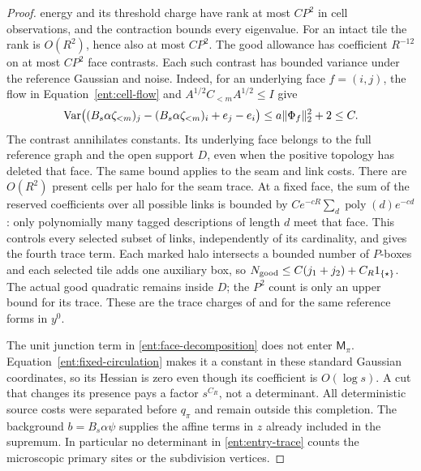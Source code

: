 \begin{proof}
energy and its threshold charge have rank at most \(CP^2\) in cell
observations, and the contraction bounds every eigenvalue.
For an intact tile the rank is \(O(R^2)\), hence also at most \(CP^2\).
The good allowance has coefficient \(R^{-12}\) on at most
\(CP^2\) face contrasts.  Each such contrast has bounded variance
under the reference Gaussian and noise.  Indeed, for an underlying
face \(f=(i,j)\), the flow in Equation~\eqref{ent:cell-flow} and
\(A^{1/2}C_{<m}A^{1/2}\le I\) give
\[
 \operatorname{Var}\bigl((B_s\alpha\zeta_{<m})_j-(B_s\alpha\zeta_{<m})_i
                              +e_j-e_i\bigr)
       \le a\|\Phi_f\|_2^2+2\le C.
\]
The contrast annihilates constants.  Its underlying face belongs to
the full reference graph and the open support \(D\), even when the
positive topology has deleted that face.  The same bound applies to
the seam and link costs.  There are \(O(R^2)\) present
cells per halo for the seam trace.  At a fixed face, the sum of the
reserved coefficients over all possible links is bounded by
\(Ce^{-cR}\sum_d\operatorname{poly}(d)e^{-cd}\): only polynomially
many tagged descriptions of length \(d\) meet that face.  This controls
every selected subset of links, independently of its cardinality, and
gives the fourth trace term.  Each marked halo intersects a bounded
number of \(P\)-boxes and each selected tile adds one auxiliary box, so
\(N_{\rm good}\le C(j_1+j_2)+C_R1_{\{\star\}}\).
The actual good quadratic remains inside \(D\); the
\(P^2\) count is only an upper bound for its trace.
These are the trace charges of
\cite[Equation~(9.26)]{B} and
\cite[Equation~(5.24)]{C} for the same reference forms
in \(y^0\).

The unit junction term in \eqref{ent:face-decomposition}
does not enter \(\mathsf M_\pi\).  Equation~\eqref{ent:fixed-circulation}
makes it a constant in these standard Gaussian coordinates,
so its Hessian is zero even though its coefficient is
\(O(\log s)\).  A cut that changes its presence pays a
factor \(s^{C_R}\), not a determinant.  All deterministic source
costs were separated before \(q_\pi\) and remain outside this
completion.  The background \(b=B_s\alpha\psi\) supplies the affine
terms in \(z\) already included in the supremum.  In particular no determinant
in \eqref{ent:entry-trace} counts the microscopic primary
sites or the subdivision vertices.


\end{proof}
